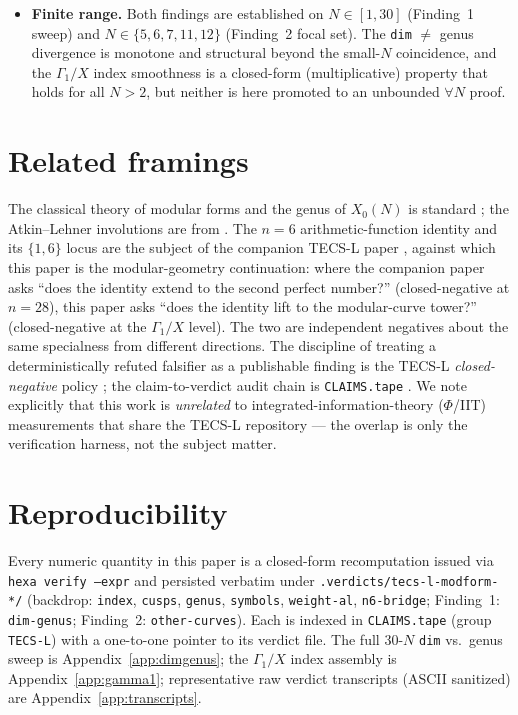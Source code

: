 \documentclass[11pt,a4paper]{article}
\newcommand{\Go}{\Gamma_1}
\theoremstyle{definition}
\begin{document}
\begin{itemize}
\item \textbf{Finite range.} Both findings are established on $N\in[1,30]$
(Finding~1 sweep) and $N\in\{5,6,7,11,12\}$ (Finding~2 focal set). The
\texttt{dim} $\ne$ genus divergence is monotone and structural beyond the small-$N$
coincidence, and the $\Go/X$ index smoothness is a closed-form (multiplicative)
property that holds for all $N>2$, but neither is here promoted to an unbounded
$\forall N$ proof.
\end{itemize}

\section{Related framings}
\label{sec:related}

The classical theory of modular forms and the genus of $X_0(N)$ is standard
\citep{diamond-shurman,shimura}; the Atkin--Lehner involutions are from
\citep{atkin-lehner}. The $n=6$ arithmetic-function identity and its $\{1,6\}$
locus are the subject of the companion TECS-L paper \citep{tecs-l-locus}, against
which this paper is the modular-geometry continuation: where the companion paper
asks ``does the identity extend to the second perfect number?'' (closed-negative
at $n=28$), this paper asks ``does the identity lift to the modular-curve tower?''
(closed-negative at the $\Go/X$ level). The two are independent negatives about
the same specialness from different directions. The discipline of treating a
deterministically refuted falsifier as a publishable finding is the TECS-L
\emph{closed-negative} policy \citep{tecs-l-negative-ok}; the claim-to-verdict
audit chain is \texttt{CLAIMS.tape} \citep{tecs-l-claims}. We note explicitly
that this work is \emph{unrelated} to integrated-information-theory ($\Phi$/IIT)
measurements that share the TECS-L repository --- the overlap is only the
verification harness, not the subject matter.

\section*{Reproducibility}

Every numeric quantity in this paper is a closed-form recomputation issued via
\texttt{hexa verify --expr} and persisted verbatim under
\texttt{.verdicts/tecs-l-modform-*/} (backdrop: \texttt{index}, \texttt{cusps},
\texttt{genus}, \texttt{symbols}, \texttt{weight-al}, \texttt{n6-bridge};
Finding~1: \texttt{dim-genus}; Finding~2: \texttt{other-curves}). Each is indexed
in \texttt{CLAIMS.tape} (group \texttt{TECS-L}) with a one-to-one pointer to its
verdict file. The full $30$-$N$ \texttt{dim} vs.\ genus sweep is
Appendix~\ref{app:dimgenus}; the $\Go/X$ index assembly is
Appendix~\ref{app:gamma1}; representative raw verdict transcripts (ASCII
sanitized) are Appendix~\ref{app:transcripts}.
\end{document}
